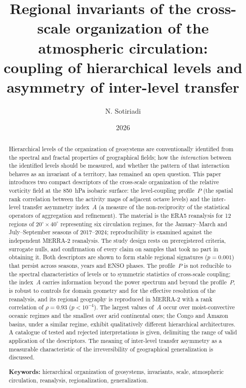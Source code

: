 \documentclass[11pt,a4paper]{article}
\title{Regional invariants of the cross-scale organization of the atmospheric circulation:\\
coupling of hierarchical levels and asymmetry of inter-level transfer}
\author{N. Sotiriadi}
\date{2026}
\begin{document}
\maketitle

\begin{abstract}
Hierarchical levels of the organization of geosystems are conventionally identified from the spectral and fractal properties of geographical fields; how the \emph{interaction} between the identified levels should be measured, and whether the pattern of that interaction behaves as an invariant of a territory, has remained an open question. This paper introduces two compact descriptors of the cross-scale organization of the relative vorticity field at the 850~hPa isobaric surface: the level-coupling profile~$P$ (the spatial rank correlation between the activity maps of adjacent octave levels) and the inter-level transfer asymmetry index~$A$ (a measure of the non-reciprocity of the statistical operators of aggregation and refinement). The material is the ERA5 reanalysis for 12 regions of $20^\circ\times40^\circ$ representing six circulation regimes, for the January--March and July--September seasons of 2017--2024; reproducibility is examined against the independent MERRA-2 reanalysis. The study design rests on preregistered criteria, surrogate nulls, and confirmation of every claim on samples that took no part in obtaining it. Both descriptors are shown to form stable regional signatures ($p=0.001$) that persist across seasons, years and ENSO phases. The profile~$P$ is not reducible to the spectral characteristics of levels or to symmetric statistics of cross-scale coupling; the index~$A$ carries information beyond the power spectrum and beyond the profile~$P$, is robust to controls for domain geometry and for the effective resolution of the reanalysis, and its regional geography is reproduced in MERRA-2 with a rank correlation of $\rho=0.93$ ($p<10^{-4}$). The largest values of~$A$ occur over moist-convective oceanic regimes and the smallest over arid continental ones; the Congo and Amazon basins, under a similar regime, exhibit qualitatively different hierarchical architectures. A catalogue of tested and rejected interpretations is given, delimiting the range of valid application of the descriptors. The meaning of inter-level transfer asymmetry as a measurable characteristic of the irreversibility of geographical generalization is discussed.

\smallskip
\noindent\textbf{Keywords:} hierarchical organization of geosystems, invariants, scale, atmospheric circulation, reanalysis, regionalization, generalization.
\end{abstract}
\end{document}
